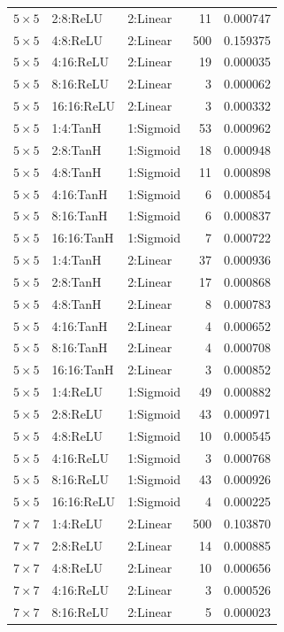 \begin{table}[h]
\begin{tabular}{lllrr}
		$5\times5$ & 2:8:ReLU & 2:Linear & 11 & 0.000747 \\
		$5\times5$ & 4:8:ReLU & 2:Linear & 500 & 0.159375 \\
		$5\times5$ & 4:16:ReLU & 2:Linear & 19 & 0.000035 \\
		$5\times5$ & 8:16:ReLU & 2:Linear & 3 & 0.000062 \\
		$5\times5$ & 16:16:ReLU & 2:Linear & 3 & 0.000332 \\
		$5\times5$ & 1:4:TanH & 1:Sigmoid & 53 & 0.000962 \\
		$5\times5$ & 2:8:TanH & 1:Sigmoid & 18 & 0.000948 \\
		$5\times5$ & 4:8:TanH & 1:Sigmoid & 11 & 0.000898 \\
		$5\times5$ & 4:16:TanH & 1:Sigmoid & 6 & 0.000854 \\
		$5\times5$ & 8:16:TanH & 1:Sigmoid & 6 & 0.000837 \\
		$5\times5$ & 16:16:TanH & 1:Sigmoid & 7 & 0.000722 \\
		$5\times5$ & 1:4:TanH & 2:Linear & 37 & 0.000936 \\
		$5\times5$ & 2:8:TanH & 2:Linear & 17 & 0.000868 \\
		$5\times5$ & 4:8:TanH & 2:Linear & 8 & 0.000783 \\
		$5\times5$ & 4:16:TanH & 2:Linear & 4 & 0.000652 \\
		$5\times5$ & 8:16:TanH & 2:Linear & 4 & 0.000708 \\
		$5\times5$ & 16:16:TanH & 2:Linear & 3 & 0.000852 \\
		$5\times5$ & 1:4:ReLU & 1:Sigmoid & 49 & 0.000882 \\
		$5\times5$ & 2:8:ReLU & 1:Sigmoid & 43 & 0.000971 \\
		$5\times5$ & 4:8:ReLU & 1:Sigmoid & 10 & 0.000545 \\
		$5\times5$ & 4:16:ReLU & 1:Sigmoid & 3 & 0.000768 \\
		$5\times5$ & 8:16:ReLU & 1:Sigmoid & 43 & 0.000926 \\
		$5\times5$ & 16:16:ReLU & 1:Sigmoid & 4 & 0.000225 \\
		\midrule
		$7\times7$ & 1:4:ReLU & 2:Linear & 500 & 0.103870 \\
		$7\times7$ & 2:8:ReLU & 2:Linear & 14 & 0.000885 \\
		$7\times7$ & 4:8:ReLU & 2:Linear & 10 & 0.000656 \\
		$7\times7$ & 4:16:ReLU & 2:Linear & 3 & 0.000526 \\
		$7\times7$ & 8:16:ReLU & 2:Linear & 5 & 0.000023 \\

\end{tabular}
\end{table}
